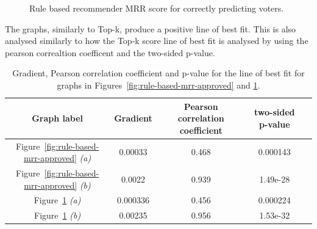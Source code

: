 \begin{figure}[H]%
    \centering
    \caption{Rule based recommender MRR score for correctly predicting voters.}%
    \label{fig:rule-based-mrr-voted}%
\end{figure}

The graphs, similarly to Top-k, produce a positive line of best fit. This is also analysed similarly to how the Top-k score line of best fit is analysed by using the pearson correaltion coefficent and the two-sided p-value.

\begin{table}[H]
    \centering
    \begin{tabular}{@{}c c c c c@{}} 
    \hline
    \textbf{Graph label} & \textbf{Gradient} & \textbf{Pearson correlation coefficient} & \textbf{two-sided p-value} \\
    \hline
Figure~\ref{fig:rule-based-mrr-approved} \emph{(a)} & 0.00033 & 0.468 & 0.000143 \\
Figure~\ref{fig:rule-based-mrr-approved} \emph{(b)} & 0.0022 & 0.939 & 1.49e-28 \\
Figure~\ref{fig:rule-based-mrr-voted} \emph{(a)} & 0.000336 & 0.456 & 0.000224 \\
Figure~\ref{fig:rule-based-mrr-voted} \emph{(b)} & 0.00235 & 0.956 & 1.53e-32 \\
    \hline
    \end{tabular}
    \caption{Gradient, Pearson correlation coefficient and p-value for the line of best fit for graphs in Figures~\ref{fig:rule-based-mrr-approved} and \ref{fig:rule-based-mrr-voted}.}
    \label{table:mrr-line-of-best-fit-stats}
\end{table}

